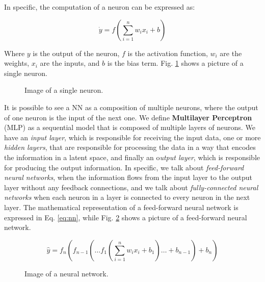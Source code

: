 In specific, the computation of a neuron can be expressed as:

\begin{equation}
    \dot{y} = f(\sum_{i=1}^{n} w_i x_i + b)\label{eq:neuron}
\end{equation}

Where $y$ is the output of the neuron, $f$ is the activation function, $w_i$ are the weights, $x_i$ are the inputs, and $b$ is the bias term.
Fig. \ref{fig:single_neuron} shows a picture of a single neuron.



\begin{figure}[ht]
    \begin{center}
        \fbox{\rule[-.5cm]{0cm}{4cm} \rule[-.5cm]{4cm}{0cm}}
    \end{center}
    \caption{Image of a single neuron.}
    \label{fig:single_neuron}
\end{figure}


It is possible to see a NN as a composition of multiple neurons, where the output of one neuron is the input of the next one.
We define \textbf{Multilayer Perceptron} (MLP) as a sequential model that is composed of multiple layers of neurons.
We have an \textit{input layer}, which is responsible for receiving the input data, one or more \textit{hidden layers}, that are responsible for processing the data in a way that encodes the information in a latent space, and finally an o\textit{utput layer}, which is responsible for producing the output information.
In specific, we talk about \textit{feed-forward neural networks}, when the information flows from the input layer to the output layer without any feedback connections, and we talk about \textit{fully-connected neural networks} when each neuron in a layer is connected to every neuron in the next layer.
The mathematical representation of a feed-forward neural network is expressed in Eq. \ref{eq:nn}, while Fig. \ref{fig:nn} shows a picture of a feed-forward neural network.


\begin{equation}
    \hat{y} = f_n(f_{n-1}(\dots f_1(\sum_{i=1}^{n} w_i x_i + b_1) \dots + b_{n-1}) + b_n)
    \label{eq:nn}
\end{equation}


\begin{figure}[ht]
    \begin{center}
        \fbox{\rule[-.5cm]{0cm}{4cm} \rule[-.5cm]{4cm}{0cm}}
    \end{center}
    \caption{Image of a neural network.}
    \label{fig:nn}
\end{figure}


